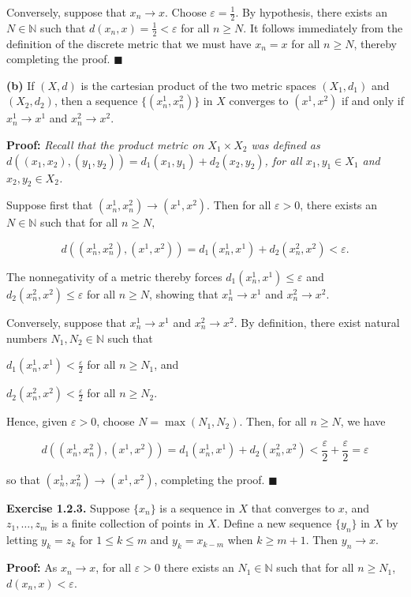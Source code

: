 \documentclass{article}
\begin{document}
Conversely, suppose that $x_n \rightarrow x$. Choose $\varepsilon=\frac{1}{2}$. By hypothesis, there exists an $N\in \mathbb{N}$ such that $d(x_n,x)=\frac{1}{2}<\varepsilon$ for all $n\geq N$. It follows immediately from the definition of the discrete metric that we must have $x_n=x$ for all $n\geq N$, thereby completing the proof. $\blacksquare$
\begin{tcolorbox}
\textbf{(b)} If $(X,d)$ is the cartesian product of the two metric spaces $(X_1,d_1)$ and $(X_2,d_2)$, then a sequence $\{(x_n^1,x_n^2)\}$ in $X$ converges to $(x^1,x^2)$ if and only if $x_n^1\to x^1$ and $x_n^2\to x^2$.
\end{tcolorbox}
\textbf{Proof:} \textit{Recall that the product metric on $X_1\times X_2$ was defined as \\
$d((x_1,x_2),(y_1,y_2))=d_1(x_1,y_1)+d_2(x_2,y_2)$, for all $x_1,y_1\in X_1$ and $x_2,y_2\in X_2$.}

Suppose first that $(x_n^1,x_n^2)\to (x^1,x^2)$. Then for all $\varepsilon>0$, there exists an $N\in \mathbb{N}$ such that for all $n\geq N,$

\begin{equation*}d((x_n^1,x_n^2),(x^1,x^2))=d_1(x_n^1,x^1)+d_2(x_n^2,x^2)<\varepsilon.\end{equation*}

The nonnegativity of a metric thereby forces $d_1(x_n^1,x^1)\leq\varepsilon$ and $d_2(x_n^2,x^2)\leq\varepsilon$ for all $n\geq N$, showing that $x_n^1\to x^1$ and $x_n^2\to x^2$.

Conversely, suppose that $x_n^1\to x^1$ and $x_n^2\to x^2$. By definition, there exist natural numbers $N_1,N_2\in \mathbb{N}$ such that 

$d_1(x_n^1,x^1)<\frac{\varepsilon}{2}$ for all $n\geq N_1$, and

$d_2(x_n^2,x^2)<\frac{\varepsilon}{2}$ for all $n\geq N_2$.

Hence, given $\varepsilon>0$, choose $N=\max(N_1,N_2).$ Then, for all $n\geq N$, we have 

\begin{equation*}
    d((x_n^1,x_n^2),(x^1,x^2))=d_1(x_n^1,x^1)+d_2(x_n^2,x^2)<\frac{\varepsilon}{2}+\frac{\varepsilon}{2}=\varepsilon
\end{equation*}

so that $(x_n^1,x_n^2)\to (x^1,x^2)$, completing the proof. $\blacksquare$

\begin{tcolorbox}
\textbf{Exercise 1.2.3.} Suppose $\{x_n\}$ is a sequence in $X$ that converges to $x$, and $z_1,\dots ,z_m$ is a finite collection of points in $X$. Define a new sequence $\{y_n\}$ in $X$ by letting $y_k=z_k$ for $1\leq k\leq m$ and $y_k=x_{k-m}$ when $k\geq m+1$. Then $y_n\to x$.
\end{tcolorbox}
\textbf{Proof:} As $x_n\to x$, for all $\varepsilon>0$ there exists an $N_1\in \mathbb{N}$ such that for all $n\geq N_1$, $d(x_n,x)<\varepsilon$. 
\end{document}
